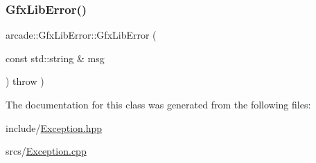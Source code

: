 \mbox{\label{classarcade_1_1_gfx_lib_error_a4a74810744427eecd13717581ae29cda}} 
\subsubsection{\texorpdfstring{Gfx\+Lib\+Error()}{GfxLibError()}}
{\footnotesize\ttfamily arcade\+::\+Gfx\+Lib\+Error\+::\+Gfx\+Lib\+Error (\begin{DoxyParamCaption}\item[{const std\+::string \&}]{msg }\end{DoxyParamCaption}) throw  ) }



The documentation for this class was generated from the following files\+:\begin{DoxyCompactItemize}
\item 
include/\hyperlink{_exception_8hpp}{Exception.\+hpp}\item 
srcs/\hyperlink{_exception_8cpp}{Exception.\+cpp}\end{DoxyCompactItemize}
